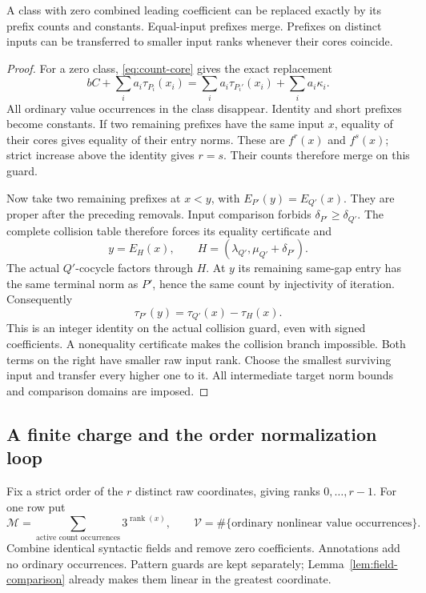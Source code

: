 \begin{lemma}\label{lem:count-transfer}
A class with zero combined leading coefficient can be replaced exactly by
its prefix counts and constants. Equal-input prefixes merge. Prefixes on
distinct inputs can be transferred to smaller input ranks whenever their
cores coincide.
\end{lemma}
\begin{proof}
For a zero class, \eqref{eq:count-core} gives the exact replacement
\begin{equation}\label{eq:zero-replacement}
 bC+\sum_i a_i\tau_{P_i}(x_i)
   =\sum_i a_i\tau_{P_i'}(x_i)+\sum_i a_i\kappa_i.
\end{equation}
All ordinary value occurrences in the class disappear. Identity and
short prefixes become constants. If two remaining prefixes have the
same input \(x\), equality of their cores gives equality of their entry
norms. These are \(f^r(x)\) and \(f^s(x)\); strict increase above the
identity gives \(r=s\). Their counts therefore merge on this guard.

Now take two remaining prefixes at \(x<y\), with
\(E_{P'}(y)=E_{Q'}(x)\). They are proper after the preceding removals.
Input comparison forbids \(\delta_{P'}\ge\delta_{Q'}\).
The complete collision table therefore forces its equality certificate
and
\[
 y=E_H(x),\qquad
 H=(\lambda_{Q'},\mu_{Q'}+\delta_{P'}).
\]
The actual \(Q'\)-cocycle factors through \(H\). At \(y\) its
remaining same-gap entry has the same terminal norm as \(P'\), hence
the same count by injectivity of iteration. Consequently
\begin{equation}\label{eq:rank-transfer}
 \tau_{P'}(y)=\tau_{Q'}(x)-\tau_H(x).
\end{equation}
This is an integer identity on the actual collision guard, even with
signed coefficients. A nonequality certificate makes the collision
branch impossible. Both terms on the right have smaller raw input rank.
Choose the smallest surviving input and transfer every higher one to it.
All intermediate target norm bounds and comparison domains are imposed.
\end{proof}

\subsection{A finite charge and the order normalization loop}

Fix a strict order of the \(r\) distinct raw coordinates, giving ranks
\(0,\ldots,r-1\). For one row put
\begin{equation}\label{eq:finite-charge}
 \mathcal M=\sum_{\text{active count occurrences}}3^{\operatorname{rank}(x)},
 \qquad
 \mathcal V=\#\{\text{ordinary nonlinear value occurrences}\}.
\end{equation}
Combine identical syntactic fields and remove zero coefficients.
Annotations add no ordinary occurrences. Pattern guards are kept
separately; Lemma~\ref{lem:field-comparison} already makes them linear
in the greatest coordinate.


